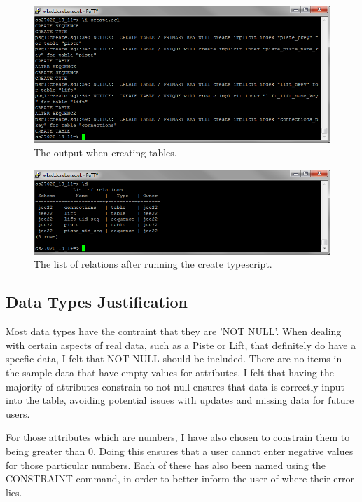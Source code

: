 \documentclass[11pt]{scrartcl} %
\begin{document}
\begin{figure}[H]
  \centering
    \includegraphics[width=1\textwidth]{IMG/create_tables.png}
 \caption{The output when creating tables.}
\end{figure}
\begin{figure}[H]
  \centering
    \includegraphics[width=1\textwidth]{IMG/completed_tables.png}
 \caption{The list of relations after running the create typescript.}
\end{figure}

\subsection{Data Types Justification}
Most data types have the contraint that they are 'NOT NULL'. When dealing with certain aspects of real data, such as a Piste or Lift, that definitely do have a specfic data, I felt that NOT NULL should be included. There are no items in the sample data that have empty values for attributes. I felt that having the majority of attributes constrain to not null ensures that data is correctly input into the table, avoiding potential issues with updates and missing data for future users.

For those attributes which are numbers, I have also chosen to constrain them to being greater than 0. Doing this ensures that a user cannot enter negative values for those particular numbers. Each of these has also been named using the CONSTRAINT command, in order to better inform the user of where their error lies.
\end{document}
